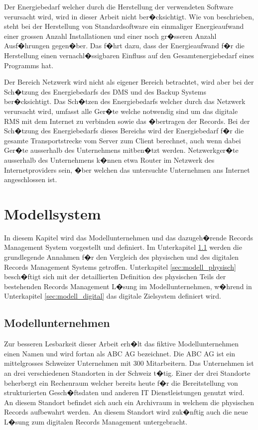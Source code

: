 \documentclass[a4paper,twoside,10pt]{report}
\begin{document}
Der Energiebedarf welcher durch die Herstellung der verwendeten Software verursacht wird, wird in dieser Arbeit nicht ber�cksichtigt. Wie von \citeauthor{gsoft} beschrieben, steht bei der Herstellung von Standardsoftware ein einmaliger Energieaufwand einer grossen Anzahl Installationen und einer noch gr�sseren Anzahl Ausf�hrungen gegen�ber. Das f�hrt dazu, dass der Energieaufwand f�r die Herstellung einen vernachl�ssigbaren Einfluss auf den Gesamtenergiebedarf eines Programms hat. \cite{gsoft}

Der Bereich Netzwerk wird nicht als eigener Bereich betrachtet, wird aber bei der Sch�tzung des Energiebedarfs des \ac{DMS} und des Backup Systems ber�cksichtigt. Das Sch�tzen des Energiebedarfs welcher durch das Netzwerk verursacht wird, umfasst alle Ger�te welche notwendig sind um das digitale \ac{RMS} mit dem Internet zu verbinden sowie das �bertragen der Records. Bei der Sch�tzung des Energiebedarfs dieses Bereichs wird der Energiebedarf f�r die gesamte Transportstrecke vom Server zum Client berechnet, auch wenn dabei Ger�te ausserhalb des Unternehmens mitben�tzt werden. Netzwerkger�te ausserhalb des Unternehmens k�nnen etwa Router im Netzwerk des Internetproviders sein, �ber welchen das untersuchte Unternehmen ans Internet angeschlossen ist.

\acresetall
\chapter{Modellsystem}\label{modell}

In diesem Kapitel wird das Modellunternehmen und das dazugeh�rende Records Management System vorgestellt und definiert. Im Unterkapitel \ref{sec:def_modell_UN} werden die grundlegende Annahmen f�r den Vergleich des physischen und des digitalen Records Management Systems getroffen. Unterkapitel \ref{sec:modell_physisch} besch�ftigt sich mit der detaillierten Definition des physischen Teils der bestehenden Records Management L�sung im Modellunternehmen, w�hrend in Unterkapitel \ref{sec:modell_digital} das digitale Zielsystem definiert wird.

\section{Modellunternehmen}\label{sec:def_modell_UN}
Zur besseren Lesbarkeit dieser Arbeit erh�lt das fiktive Modellunternehmen einen Namen und wird fortan als ABC AG bezeichnet. Die ABC AG ist ein mittelgrosses Schweizer Unternehmen mit 300 Mitarbeitern. Das Unternehmen ist an drei verschiedenen Standorten in der Schweiz t�tig. Einer der drei Standorte beherbergt ein Rechenraum welcher bereits heute f�r die Bereitstellung von strukturierten Gesch�ftsdaten und anderen IT Dienstleistungen genutzt wird. An diesem Standort befindet sich auch ein Archivraum in welchem die physischen Records aufbewahrt werden. An diesem Standort wird zuk�nftig auch die neue L�sung zum digitalen Records Management untergebracht.
\end{document}
